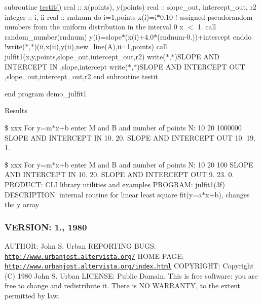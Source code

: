 subroutine \hyperlink{__uname_8f90_a483d2219923eccf493a883fceee5a424}{testit()} real \+:\+: x(points), y(points) real \+:\+: slope\+\_\+out, intercept\+\_\+out, r2 integer \+:\+: i, ii real \+:\+: rndnum do i=1,points x(i)=i$\ast$0.10 ! assigned pseudorandom numbers from the uniform distribution in the interval 0 x $<$ 1. call random\+\_\+number(rndnum) y(i)=slope$\ast$(x(i)+4.0$\ast$(rndnum-\/0.))+intercept enddo !write($\ast$,$\ast$)(ii,x(ii),y(ii),new\+\_\+line(\textquotesingle{}A\textquotesingle{}),ii=1,points) call julfit1(x,y,points,slope\+\_\+out,intercept\+\_\+out,r2) write($\ast$,$\ast$)\textquotesingle{}S\+L\+O\+PE A\+ND I\+N\+T\+E\+R\+C\+E\+PT IN \textquotesingle{},slope,intercept write($\ast$,$\ast$)\textquotesingle{}S\+L\+O\+PE A\+ND I\+N\+T\+E\+R\+C\+E\+PT O\+UT \textquotesingle{},slope\+\_\+out,intercept\+\_\+out,r2 end subroutine testit

end program demo\+\_\+julfit1

Results

\$ xxx For y=m$\ast$x+b enter M and B and number of points N\+: 10 20 1000000 S\+L\+O\+PE A\+ND I\+N\+T\+E\+R\+C\+E\+PT IN 10. 20. S\+L\+O\+PE A\+ND I\+N\+T\+E\+R\+C\+E\+PT O\+UT 10. 19. 1.

\$ xxx For y=m$\ast$x+b enter M and B and number of points N\+: 10 20 100 S\+L\+O\+PE A\+ND I\+N\+T\+E\+R\+C\+E\+PT IN 10. 20. S\+L\+O\+PE A\+ND I\+N\+T\+E\+R\+C\+E\+PT O\+UT 9. 23. 0. P\+R\+O\+D\+U\+CT\+: C\+LI library utilities and examples P\+R\+O\+G\+R\+AM\+: julfit1(3f) D\+E\+S\+C\+R\+I\+P\+T\+I\+ON\+: internal routine for linear least square fit(y=a$\ast$x+b), changes the y array \subsubsection*{V\+E\+R\+S\+I\+ON\+: 1., 1980}

A\+U\+T\+H\+OR\+: John S. Urban R\+E\+P\+O\+R\+T\+I\+NG B\+U\+GS\+: \href{http://www.urbanjost.altervista.org/}{\tt http\+://www.\+urbanjost.\+altervista.\+org/} H\+O\+ME P\+A\+GE\+: \href{http://www.urbanjost.altervista.org/index.html}{\tt http\+://www.\+urbanjost.\+altervista.\+org/index.\+html} C\+O\+P\+Y\+R\+I\+G\+HT\+: Copyright (C) 1980 John S. Urban L\+I\+C\+E\+N\+SE\+: Public Domain. This is free software\+: you are free to change and redistribute it. There is NO W\+A\+R\+R\+A\+N\+TY, to the extent permitted by law. \mbox{\label{namespacem__math_a506d6c6d2e4da1fa5efb731608531c75}} 
